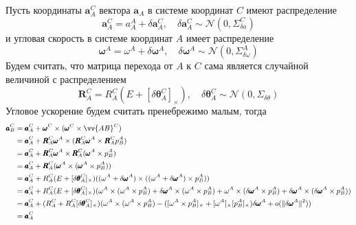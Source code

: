 \documentclass[12pt]{article}
\begin{document}
Пусть координаты $\pmb{a}_A^C$ вектора $\pmb{a}_A$ в системе координат $C$ имеют
распределение
$$
    \pmb{a}_A^C=a_A^A+\delta \pmb{a}_A^C,
    \quad
    \delta \pmb{a}_A^C \sim \mathcal{N}(0, \Sigma_{\delta a}^C)
$$
и угловая скорость в системе координат $A$ имеет распределение
$$
    \pmb{\omega}^A=\omega^A+\delta \pmb{\omega}^A,
    \quad
    \delta \pmb{\omega}^A\sim \mathcal{N}(0, \Sigma_{\delta \omega}^A)
$$
Будем считать, что матрица перехода от $A$ к $C$ сама является случайной
величиной с распределением
$$
    \pmb{R}_A^C=R_A^C(E+[\delta \pmb{\theta}_A^C]_\times),
    \quad
    \delta\pmb{\theta}_A^C \sim \mathcal{N}(0, \Sigma_{\delta \theta})
$$
Угловое ускорение будем считать пренебрежимо малым, тогда
$$
    \small{
        \begin{aligned}
            \pmb{a}_B^C
             & =\pmb{a}_A^C+\pmb{\omega}^C \times (\pmb{\omega}^C \times \vv{AB}^C)                                 \\
             & =\pmb{a}_A^C+\pmb{R}_A^C \pmb{\omega}^A \times (\pmb{R}_A^C \pmb{\omega}^A \times \pmb{R}_A^C p_B^A) \\
             & =\pmb{a}_A^C+\pmb{R}_A^C \pmb{\omega}^A \times \pmb{R}_A^C( \pmb{\omega}^A \times p_B^A)             \\
             & =\pmb{a}_A^C+\pmb{R}_A^C (\pmb{\omega}^A \times ( \pmb{\omega}^A \times p_B^A))                      \\
             & =\pmb{a}_A^C
            +R_A^C (E+[\delta \pmb{\theta}_A^C]_\times)
            ((\omega^A + \delta\pmb{\omega}^A) \times
            ( (\omega^A + \delta \pmb{\omega}^A) \times p_B^A))                                                     \\
             & =\pmb{a}_A^C
            +R_A^C (E+[\delta \pmb{\theta}_A^C]_\times)
            (\omega^A \times (\omega^A\times p_B^A)
            +\delta \pmb{\omega}^A \times (\omega^A\times p_B^A)
            + \omega^A\times (\delta \pmb{\omega}^A\times p_B^A)
            +\delta \pmb{\omega}^A \times (\delta \pmb{\omega}^A\times p_B^A))                                      \\
             & =\pmb{a}_A^C
            + (R_A^C+R_A^C[\delta \pmb{\theta}_A^C]_\times)
            (\omega^A \times (\omega^A\times p_B^A)
            - ([\omega^A\times p_B^A]_\times+ [\omega^A]_\times [p_B^A]_\times) \delta \pmb{\omega}^A
            +o(\Vert\delta \pmb{\omega}^A\Vert^2))                                                                  \\
             & =\pmb{a}_A^C

\end{aligned}}$$
\end{document}
